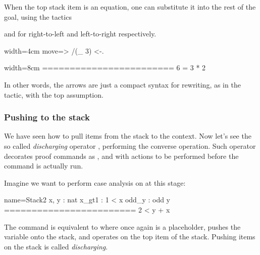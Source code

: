 When the top stack item is an equation, one can substitute it into
the rest of the goal, using the tactics \C{<-}

and \C{->} for right-to-left and left-to-right respectively.

\begin{coq}{}{width=4cm}
move=> /(_ 3) <-.
\end{coq}
\begin{coqout}{}{width=8cm}
========================
6 = 3 * 2
\end{coqout}
In other words, the arrows are just a compact syntax for rewriting,
as in the  tactic, with the top assumption.

\subsubsection{Pushing to the stack}

We have seen how to pull items from the stack to the context.
Now let's see the so called \emph{discharging} operator \C{:}, performing
the converse operation.
Such operator decorates
proof commands as ,  and 
 with actions to be performed before the command is actually run.


Imagine we want to perform case analysis on  at this stage:

\begin{coqout}{name=Stack2}{}
 x, y : nat
 x_gt1 : 1 < x
 odd_y : odd y
 ========================
 2 < y + x
\end{coqout}

The command  is equivalent to
 where  once again is a placeholder,
 pushes the  variable onto the stack, and 
operates on the top item of the stack.
Pushing items on the stack is called \emph{discharging}.

